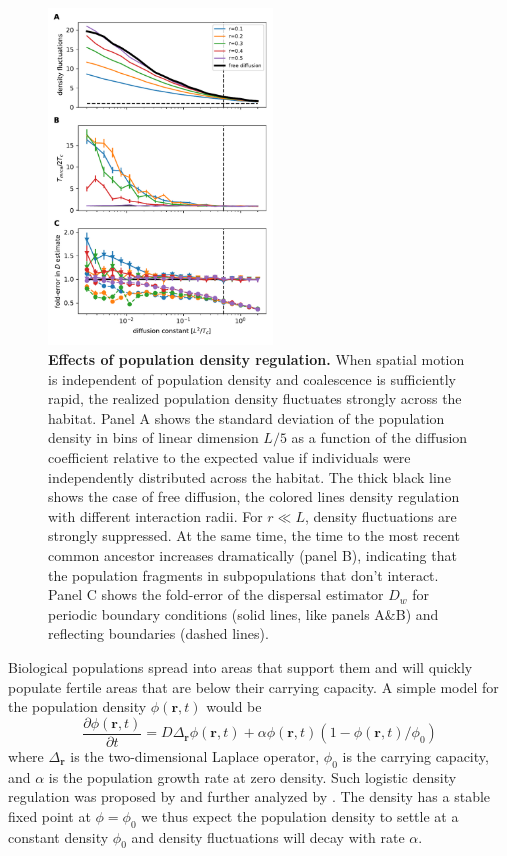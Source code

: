 \documentclass[aps,rmp, twocolumn]{revtex4}
\newcommand{\rvec}{\mathbf{r}}
\begin{document}
\begin{figure}
    \includegraphics[width=0.53\textwidth]{figures/stable_density}
    \caption{\label{fig:density_reg}  {\bf Effects of population density regulation.}
    When spatial motion is independent of population density and coalescence is sufficiently rapid, the realized population density fluctuates strongly across the habitat. Panel A shows the standard deviation of the population density in bins of linear dimension $L/5$ as a function of the diffusion coefficient relative to the expected value if individuals were independently distributed across the habitat. The thick black line shows the case of free diffusion, the colored lines density regulation with different interaction radii. For $r\ll L$, density fluctuations are strongly suppressed.
    At the same time, the time to the most recent common ancestor increases dramatically (panel B), indicating that the population fragments in subpopulations that don't interact.
    Panel C shows the fold-error of the dispersal estimator $D_w$ for periodic boundary conditions (solid lines, like panels A\&B) and reflecting boundaries (dashed lines).
    }
\end{figure}

Biological populations spread into areas that support them and will quickly populate fertile areas that are below their carrying capacity.
A simple model for the population density $\phi(\rvec,t)$ would be
\begin{equation}
    \label{eq:FKPP}
    \frac{\partial \phi(\rvec,t)}{\partial t} = D \Delta_{\rvec} \phi(\rvec,t) + \alpha \phi(\rvec,t)(1-\phi(\rvec,t)/\phi_0)
\end{equation}
where $ \Delta_{\rvec}$ is the two-dimensional Laplace operator, $\phi_0$ is the carrying capacity, and $\alpha$ is the population growth rate at zero density.
Such logistic density regulation was proposed by \citet{bolker_using_1997} and further analyzed by \citet{etheridge_survival_2004}.
The density has a stable fixed point at $\phi=\phi_0$ we thus expect the population density to settle at a constant density $\phi_0$ and density fluctuations will decay with rate $\alpha$.
\end{document}
